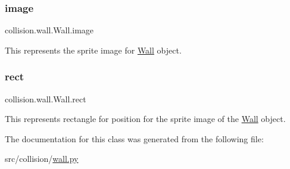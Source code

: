 \subsubsection{\texorpdfstring{image}{image}}
{\footnotesize\ttfamily collision.\+wall.\+Wall.\+image}



This represents the sprite image for \hyperlink{classcollision_1_1wall_1_1_wall}{Wall} object. 

\mbox{\label{classcollision_1_1wall_1_1_wall_a7bdfce57724f53f3b0879e12f2f3b78e}} 
\subsubsection{\texorpdfstring{rect}{rect}}
{\footnotesize\ttfamily collision.\+wall.\+Wall.\+rect}



This represents rectangle for position for the sprite image of the \hyperlink{classcollision_1_1wall_1_1_wall}{Wall} object. 



The documentation for this class was generated from the following file\+:\begin{DoxyCompactItemize}
\item 
src/collision/\hyperlink{wall_8py}{wall.\+py}\end{DoxyCompactItemize}
